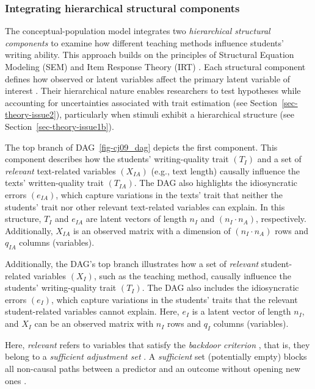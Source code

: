 \documentclass[
  authoryear,
  review,
  1p]{elsarticle}
\begin{document}
\subsubsection{Integrating hierarchical structural
components}\label{sec-theory-theoretical_P3}

The conceptual-population model integrates two \emph{hierarchical
structural components} to examine how different teaching methods
influence students' writing ability. This approach builds on the
principles of Structural Equation Modeling (SEM)
\citep[pp.~138]{Hoyle_et_al_2023} and Item Response Theory (IRT)
\citetext{\citealp[chap.~6]{Fox_2010}; \citealp[chap.~24]{vanderLinden_et_al_2017_I}}.
Each structural component defines how observed or latent variables
affect the primary latent variable of interest
\citep{Everitt_et_al_2010}. Their hierarchical nature enables
researchers to test hypotheses while accounting for uncertainties
associated with trait estimation (see Section~\ref{sec-theory-issue2}),
particularly when stimuli exhibit a hierarchical structure (see
Section~\ref{sec-theory-issue1b}).

The top branch of DAG~\ref{fig-cj09_dag} depicts the first component.
This component describes how the students' writing-quality trait
\((T_{I})\) and a set of \emph{relevant} text-related variables
\((X_{IA})\) (e.g., text length) causally influence the texts'
written-quality trait \((T_{IA})\). The DAG also highlights the
idiosyncratic errors \((e_{IA})\), which capture variations in the
texts' trait that neither the students' trait nor other relevant
text-related variables can explain. In this structure, \(T_{I}\) and
\(e_{IA}\) are latent vectors of length \(n_{I}\) and
\((n_{I} \cdot n_{A})\), respectively. Additionally, \(X_{IA}\) is an
observed matrix with a dimension of \((n_{I} \cdot n_{A})\) rows and
\(q_{IA}\) columns (variables).

Additionally, the DAG's top branch illustrates how a set of
\emph{relevant} student-related variables \((X_{I})\), such as the
teaching method, causally influence the students' writing-quality trait
\((T_{I})\). The DAG also includes the idiosyncratic errors \((e_{I})\),
which capture variations in the students' traits that the relevant
student-related variables cannot explain. Here, \(e_{I}\) is a latent
vector of length \(n_{I}\), and \(X_{I}\) can be an observed matrix with
\(n_{I}\) rows and \(q_{I}\) columns (variables).

Here, \emph{relevant} refers to variables that satisfy the
\emph{backdoor criterion} \citep[pp 37]{Neal_2020}, that is, they belong
to a \emph{sufficient adjustment set}
\citep{Pearl_2009, Pearl_et_al_2016, Morgan_et_al_2014}. A
\emph{sufficient} set (potentially empty) blocks all non-causal paths
between a predictor and an outcome without opening new ones
\citep{Pearl_2009}.
\end{document}
